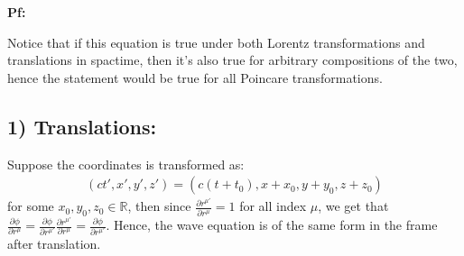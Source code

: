 \documentclass{article}
\newcommand{\RR}{\mathbb{R}}
\begin{document}
\textbf{Pf:}

Notice that if this equation is true under both Lorentz transformations and translations in spactime, then it's also true for arbitrary compositions of the two, hence the statement would be true for all Poincare transformations.

\subsection*{1) Translations:}
Suppose the coordinates is transformed as:
\begin{align}
    (ct', x', y', z') = (c(t+t_0), x+x_0, y+y_0, z+z_0)
\end{align}
for some $x_0,y_0,z_0\in\RR$, then since $\frac{\partial r^{\mu'}}{\partial r^\mu} = 1$ for all index $\mu$, we get that $\frac{\partial \phi}{\partial r^\mu} = \frac{\partial \phi}{\partial r^{\mu'}}\frac{\partial r^{\mu'}}{\partial r^\mu} = \frac{\partial \phi}{\partial r^{\mu'}}$. Hence, the wave equation is of the same form in the frame after translation.
\end{document}
